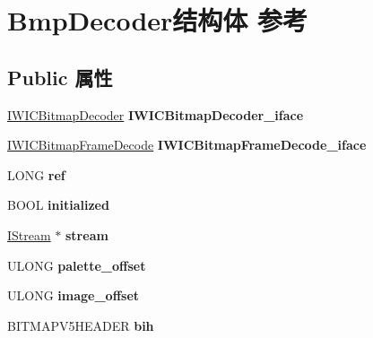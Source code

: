 \hypertarget{struct_bmp_decoder}{}\section{Bmp\+Decoder结构体 参考}
\label{struct_bmp_decoder}
\subsection*{Public 属性}
\begin{DoxyCompactItemize}
\item 
\mbox{\label{struct_bmp_decoder_a5a6f09205fd19d9327ecd20df2f2d321}} 
\hyperlink{interface_i_w_i_c_bitmap_decoder}{I\+W\+I\+C\+Bitmap\+Decoder} {\bfseries I\+W\+I\+C\+Bitmap\+Decoder\+\_\+iface}
\item 
\mbox{\label{struct_bmp_decoder_ab8945eb35a2e51724ca5567ed704292b}} 
\hyperlink{interface_i_w_i_c_bitmap_frame_decode}{I\+W\+I\+C\+Bitmap\+Frame\+Decode} {\bfseries I\+W\+I\+C\+Bitmap\+Frame\+Decode\+\_\+iface}
\item 
\mbox{\label{struct_bmp_decoder_a3b81b7c635b57abca6b8202a2891690d}} 
L\+O\+NG {\bfseries ref}
\item 
\mbox{\label{struct_bmp_decoder_a04fd2571d9efea4d0ed3eab9b31696f1}} 
B\+O\+OL {\bfseries initialized}
\item 
\mbox{\label{struct_bmp_decoder_abd48d4d1b2e80b424067248f5e5a0758}} 
\hyperlink{interface_i_stream}{I\+Stream} $\ast$ {\bfseries stream}
\item 
\mbox{\label{struct_bmp_decoder_a12c469f367945d33c004da842bc42469}} 
U\+L\+O\+NG {\bfseries palette\+\_\+offset}
\item 
\mbox{\label{struct_bmp_decoder_a49cf13522ab0bc40222459e96726aa20}} 
U\+L\+O\+NG {\bfseries image\+\_\+offset}
\item 
\mbox{\label{struct_bmp_decoder_ad93b1a676159df57c3675a8c0a41d4ab}} 
B\+I\+T\+M\+A\+P\+V5\+H\+E\+A\+D\+ER {\bfseries bih}
\item 
\mbox{\label{struct_bmp_decoder_aa08f5b9d1d630eedd50c013db27e327e}} 

\end{DoxyCompactItemize}
